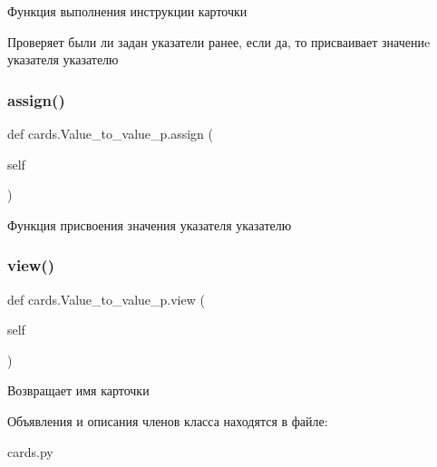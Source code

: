 Функция выполнения инструкции карточки 

Проверяет были ли задан указатели ранее, если да, то присваивает значениe указателя указателю \mbox{\label{classcards_1_1_value__to__value__p_ad215a910d5ebcfd34ecbb710c9c8a086}} 
\subsubsection{\texorpdfstring{assign()}{assign()}}
{\footnotesize\ttfamily def cards.\+Value\+\_\+to\+\_\+value\+\_\+p.\+assign (\begin{DoxyParamCaption}\item[{}]{self }\end{DoxyParamCaption})}



Функция присвоения значения указателя указателю 

\mbox{\label{classcards_1_1_value__to__value__p_abd0d54ff798992b157cae1a996ee972a}} 
\subsubsection{\texorpdfstring{view()}{view()}}
{\footnotesize\ttfamily def cards.\+Value\+\_\+to\+\_\+value\+\_\+p.\+view (\begin{DoxyParamCaption}\item[{}]{self }\end{DoxyParamCaption})}



Возвращает имя карточки 



Объявления и описания членов класса находятся в файле\+:\begin{DoxyCompactItemize}
\item 
cards.\+py\end{DoxyCompactItemize}
